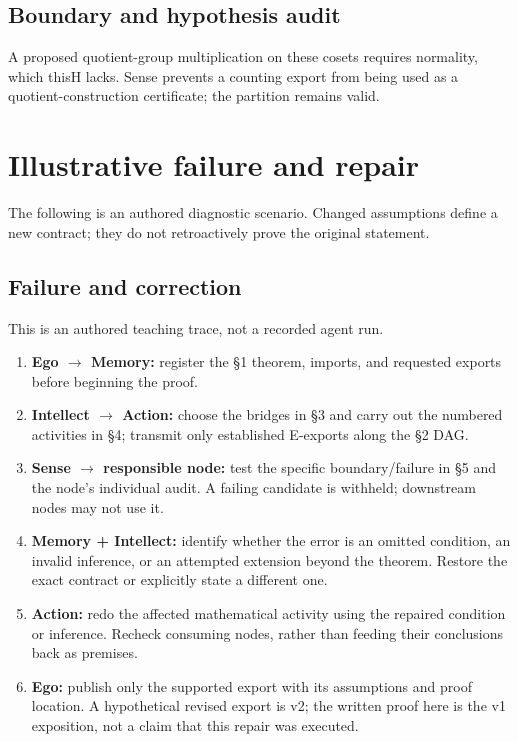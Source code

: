 \documentclass[preprint,12pt,aps,pra,showkeys,amsmath,amssymb,superscriptaddress,floatfix]{revtex4-2}
\theoremstyle{definition}
\theoremstyle{remark}
\providecommand{\tightlist}{\setlength{\itemsep}{2pt}\setlength{\parskip}{0pt}}
\begin{document}
\subsection{Boundary and hypothesis audit}

A proposed quotient-group multiplication on these cosets requires
normality, which thisH lacks. Sense prevents a counting export from
being used as a quotient-construction certificate; the partition remains
valid.

\section{Illustrative failure and repair}

The following is an authored diagnostic scenario. Changed assumptions
define a new contract; they do not retroactively prove the original
statement.

\subsection{Failure and correction}
This is an authored teaching trace, not a recorded agent run.

\begin{enumerate}
\def\labelenumi{\arabic{enumi}.}
\tightlist
\item
  \textbf{Ego \(\to\) Memory:} register the §1 theorem, imports, and
  requested exports before beginning the proof.
\item
  \textbf{Intellect \(\to\) Action:} choose the bridges in §3 and carry
  out the numbered activities in §4; transmit only established E-exports
  along the §2 DAG.
\item
  \textbf{Sense \(\to\) responsible node:} test the specific
  boundary/failure in §5 and the node's individual audit. A failing
  candidate is withheld; downstream nodes may not use it.
\item
  \textbf{Memory + Intellect:} identify whether the error is an omitted
  condition, an invalid inference, or an attempted extension beyond the
  theorem. Restore the exact contract or explicitly state a different
  one.
\item
  \textbf{Action:} redo the affected mathematical activity using the
  repaired condition or inference. Recheck consuming nodes, rather than
  feeding their conclusions back as premises.
\item
  \textbf{Ego:} publish only the supported export with its assumptions
  and proof location. A hypothetical revised export is v2; the written
  proof here is the v1 exposition, not a claim that this repair was
  executed.
\end{enumerate}
\end{document}
